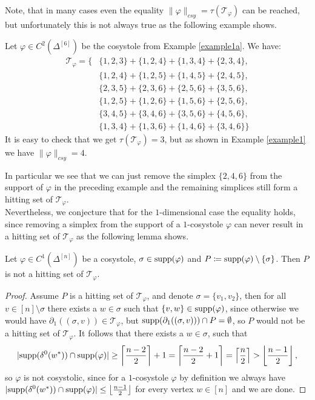 Note, that in many cases even the equality \(\|\varphi\|_{csy}=\tau(\mathcal{T}_{\varphi})\) can be reached, but unfortunately this is not always true as the following example shows.

\begin{expl}\label{example1b}
Let \(\varphi\in C^2(\Delta^{[6]})\) be the cosystole from Example \ref{example1a}. We have:
\begin{align*}
\mathcal{T}_{\varphi}=\{&\{1,2,3\}+\{1,2,4\}+\{1,3,4\}+\{2,3,4\},\\
&\{1,2,4\}+\{1,2,5\}+\{1,4,5\}+\{2,4,5\},\\
&\{2,3,5\}+\{2,3,6\}+\{2,5,6\}+\{3,5,6\},\\
&\{1,2,5\}+\{1,2,6\}+\{1,5,6\}+\{2,5,6\},\\
&\{3,4,5\}+\{3,4,6\}+\{3,5,6\}+\{4,5,6\},\\
&\{1,3,4\}+\{1,3,6\}+\{1,4,6\}+\{3,4,6\}\}
\end{align*}
It is easy to check that we get \(\tau(\mathcal{T}_{\varphi})=3\), but as shown in Example \ref{example1} we have \(\|\varphi\|_{csy}=4\).
\end{expl}
In particular we see that we can just remove the simplex \(\{2,4,6\}\) from the support of \(\varphi\) in the preceding example and the remaining simplices still form a hitting set of \(\mathcal{T}_{\varphi}\).\\
Nevertheless, we conjecture that for the \(1\)-dimensional case the equality holds, since removing a simplex from the support of a \(1\)-cosystole \(\varphi\) can never result in a hitting set of \(\mathcal{T}_{\varphi}\) as the following lemma shows.

\begin{lem}\label{lemma211}
Let \(\varphi\in C^1(\Delta^{[n]})\) be a cosystole, \(\sigma\in\mathrm{supp}(\varphi)\) and \(P\coloneqq \mathrm{supp}(\varphi)\setminus\{\sigma\}\). Then \(P\) is not a hitting set of \(\mathcal{T}_{\varphi}\).
\begin{proof}
Assume \(P\) is a hitting set of \(\mathcal{T}_{\varphi}\), and denote \(\sigma=\{v_1,v_2\}\), then for all \(v\in[n]\setminus\sigma\) there exists a \(w\in\sigma\) such that \(\{v,w\}\in\mathrm{supp}(\varphi)\), since otherwise we would have \(\partial_1((\sigma,v))\in\mathcal{T}_{\varphi}\), but \(\mathrm{supp}(\partial_1((\sigma,v)))\cap P=\emptyset\), so \(P\) would not be a hitting set of \(\mathcal{T}_{\varphi}\). It follows that there exists a \(w\in\sigma\), such that
\[
|\mathrm{supp}(\delta^0(w^*))\cap\mathrm{supp}(\varphi)|\geq\left\lceil\frac{n-2}{2}\right\rceil+1=\left\lceil\frac{n-2}{2}+1\right\rceil=\left\lceil\frac{n}{2}\right\rceil>\left\lfloor\frac{n-1}{2}\right\rfloor,
\]
so \(\varphi\) is not cosystolic, since for a \(1\)-cosystole \(\varphi\) by definition we always have\\
\(|\mathrm{supp}(\delta^0(w^*))\cap\mathrm{supp}(\varphi)|\leq\left\lfloor\frac{n-1}{2}\right\rfloor\) for every vertex \(w\in [n]\) and we are done.
\end{proof}
\end{lem}

